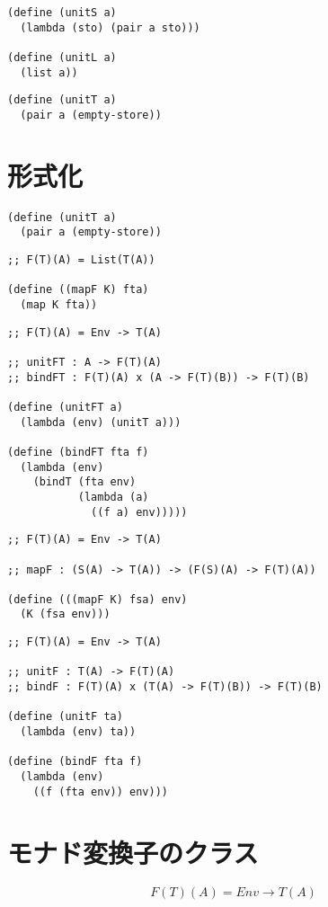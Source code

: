 \documentclass[11pt, oneside]{jsbook}   	%
\begin{document}
\begin{lstlisting}
(define (unitS a)
  (lambda (sto) (pair a sto)))

(define (unitL a)
  (list a)) 
\end{lstlisting}

\begin{lstlisting}
(define (unitT a)
  (pair a (empty-store))
  \end{lstlisting}

\section{  形式化 }
\begin{lstlisting}
(define (unitT a)
  (pair a (empty-store))
\end{lstlisting}

\begin{lstlisting}
;; F(T)(A) = List(T(A))

(define ((mapF K) fta)
  (map K fta))
\end{lstlisting}

\begin{lstlisting}
;; F(T)(A) = Env -> T(A)

;; unitFT : A -> F(T)(A)
;; bindFT : F(T)(A) x (A -> F(T)(B)) -> F(T)(B)

(define (unitFT a)
  (lambda (env) (unitT a)))

(define (bindFT fta f)
  (lambda (env)
    (bindT (fta env)
           (lambda (a)
             ((f a) env)))))
\end{lstlisting}

\begin{lstlisting}  
;; F(T)(A) = Env -> T(A)

;; mapF : (S(A) -> T(A)) -> (F(S)(A) -> F(T)(A))

(define (((mapF K) fsa) env)
  (K (fsa env)))
\end{lstlisting}

\begin{lstlisting}
;; F(T)(A) = Env -> T(A)

;; unitF : T(A) -> F(T)(A)
;; bindF : F(T)(A) x (T(A) -> F(T)(B)) -> F(T)(B)

(define (unitF ta)
  (lambda (env) ta))

(define (bindF fta f)
  (lambda (env)
    ((f (fta env)) env)))
\end{lstlisting}

\section{ モナド変換子のクラス }
$$
F(T)(A) = Env \rightarrow T(A)
$$
\end{document}
